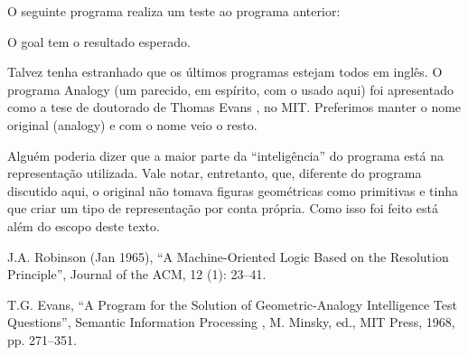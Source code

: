 \documentclass{article}
\begin{document}
O seguinte programa realiza um teste ao programa anterior:



O goal  tem o resultado esperado.

Talvez tenha estranhado que os últimos programas estejam todos em inglês. O programa Analogy (um parecido, em espírito, com o usado aqui) foi apresentado como a tese de doutorado de Thomas Evans \cite{evans}, no MIT. Preferimos manter o nome original (analogy) e com o nome veio o resto.

Alguém poderia dizer que a maior parte da ``inteligência'' do programa está na representação utilizada.
Vale notar, entretanto, que, diferente do programa discutido aqui, o original não tomava figuras geométricas como
primitivas e tinha que criar um tipo de representação por conta própria. Como isso foi feito está além do escopo deste texto.


  \begin{thebibliography}{1}

    J.A. Robinson (Jan 1965), ``A Machine-Oriented Logic Based on the Resolution Principle'', Journal of the ACM, 12 (1): 23–41.

    T.G. Evans, “A Program for the Solution of Geometric-Analogy Intelligence Test Questions”, Semantic Information Processing , M. Minsky, ed., MIT Press, 1968, pp. 271–351.

  \end{thebibliography}
\end{document}
